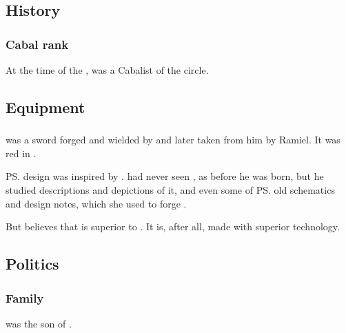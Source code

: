 \subsection{History}





\subsubsection{Cabal rank}
At the time of the \thirdbanewar, \Dasteron was a Cabalist of the \dasteroncircle circle. 









\subsection{Equipment}





\subsubsection{\Scaleron}
\Scaleron{} was a  sword forged and wielded by \Dasteron{} and later taken from him by Ramiel. 
It was red in \colour. 

\ps{\Scaleron} design was inspired by . 
\Dasteron{} had never seen \Ascaril, as  before he was born, but he studied descriptions and depictions of it, and even some of \ps{} old schematics and design notes, which she used to forge \Ascaril. 

But \Dasteron{} believes that \Scaleron{} is superior to \Ascaril. 
It is, after all, made with superior technology. 









\subsection{Politics}





\subsubsection{Family}
\Dasteron{} was the son of . 

